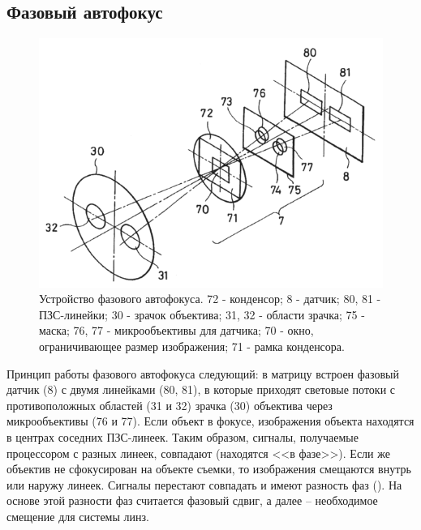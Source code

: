 \subsection{Фазовый автофокус} %
\begin{figure}[ht!] 
	\center
	\includegraphics [scale=1] {my_folder/images/phase_focus_detecror.png}
	\caption{Устройство фазового автофокуса. 72 - конденсор; 8 - датчик; 80, 81 - ПЗС-линейки; 30 - зрачок объектива; 31, 32 - области зрачка; 75 - маска; 76, 77 - микрообъективы для датчика; 70 - окно, ограничивающее размер изображения; 71 - рамка конденсора.}
	\label{fig:pdaf}
\end{figure}

Принцип работы фазового автофокуса следующий: в матрицу встроен фазовый датчик (8) с двумя линейками (80, 81), в которые приходят световые потоки с противоположных областей (31 и 32) зрачка (30) объектива через микрообъективы (76 и 77). Если объект в фокусе,  изображения объекта находятся в центрах соседних ПЗС-линеек. Таким образом, сигналы, получаемые процессором с разных линеек, совпадают (находятся <<в фазе>>). Если же объектив не сфокусирован на объекте съемки, то изображения смещаются внутрь или наружу линеек. Сигналы перестают совпадать и имеют разность фаз (). На основе этой разности фаз считается фазовый сдвиг, а далее -- необходимое смещение для системы линз.

